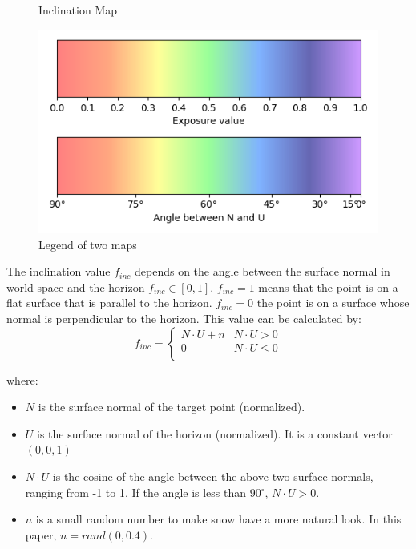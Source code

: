 \documentclass{article}
\begin{document}
\begin{figure}[h]
\begin{minipage}{0.33\textwidth}
      \caption{Inclination Map}
      \label{fig:InclinationMap}
  \end{minipage}
  \begin{minipage}{0.33\textwidth}
    \centering
    \includegraphics[width=\textwidth]{images/MapLegend.png}
    \caption{Legend of two maps}
    \label{fig:MapLegend}
\end{minipage}
\end{figure}

The inclination value \( f_{inc} \) depends on the angle between the surface normal in world space and the horizon 
\( f_{inc} \in [0, 1] \). \( f_{inc}=1 \) means that the point is on a flat surface that is parallel to the horizon. 
\( f_{inc}=0 \) the point is on a surface whose normal is perpendicular to the horizon. This value can be calculated by:
\[
  f_{inc}=
  \left\{
    \begin{array}{ll}
      N \cdot U + n & N \cdot U > 0 \\
      0 & N \cdot U \leq 0 \\
    \end{array} 
  \right. 
\]

where:
\begin{itemize}
  \item \( N \) is the surface normal of the target point (normalized).
  \item \( U \) is the surface normal of the horizon (normalized). It is a constant vector \((0, 0, 1)\)
  \item \( N \cdot U \) is the cosine of the angle between the above two surface normals, ranging from -1 to 1. If the angle is less 
  than 90$^{\circ}$, \( N \cdot U > 0\).
  \item \( n \) is a small random number to make snow have a more natural look. In this paper, \(n = rand(0, 0.4)\).
\end{itemize}
\end{document}
